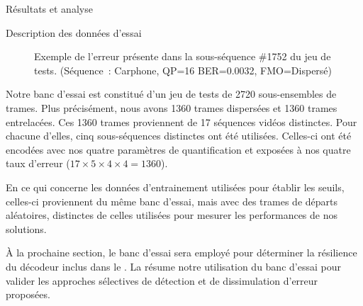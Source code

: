 \begin{chapter}{Résultats et analyse}
\begin{section}{Description des données d'essai}
\begin{figure}[htb]
\caption[Erreur présente dans la sous-séquence \#1752 du jeu de tests]{Exemple
de l'erreur présente dans la sous-séquence \#1752 du jeu de tests. (Séquence~:
Carphone, QP=16 BER=0.0032, FMO=Dispersé)}
\label{fig-1752}
\end{figure}

Notre banc d'essai est constitué d'un jeu de tests de 2720 sous-ensembles de
trames. Plus précisément, nous avons 1360 trames dispersées et 1360 trames
entrelacées. Ces 1360 trames proviennent de 17 séquences vidéos distinctes. Pour
chacune d'elles, cinq sous-séquences distinctes ont été utilisées. Celles-ci ont
été encodées avec nos quatre paramètres de quantification et exposées à nos
quatre taux d'erreur ($17 \times 5 \times 4 \times 4 = 1360$).

En ce qui concerne les données d'entrainement utilisées pour établir les
seuils, celles-ci proviennent du même banc d'essai, mais avec des trames de
départs aléatoires, distinctes de celles utilisées pour mesurer les performances
de nos solutions.

À la prochaine section, le banc d'essai sera employé pour déterminer la
résilience du décodeur inclus dans le \ltCodec. La
 résume notre utilisation du banc d'essai pour
valider les approches sélectives de détection et de dissimulation d'erreur
proposées.


\end{section}
\end{chapter}
